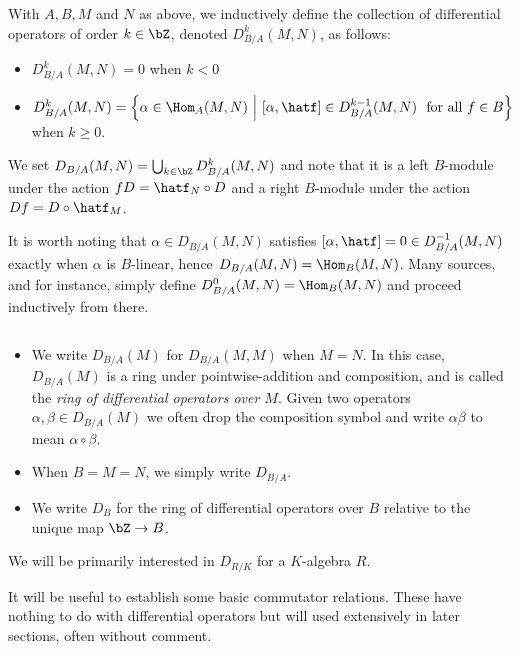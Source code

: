 \begin{defn}\label{defn:diff-ops}
	With $A,B,M$ and $N$ as above, we inductively define the collection of differential operators of order $k \in \bZ$, denoted $D^k_{B/A}(M,N)$, as follows:
	\begin{itemize}
		\item $D^k_{B/A}(M,N) = 0$ when $k < 0$
		\item $D^k_{B/A}(M,N) = \left\{\alpha \in \Hom_A(M,N) ~\middle|~ \left[\alpha,\hatf\right] \in D^{k-1}_{B/A}(M,N) ~ \text{ for all } f\in B\right\} $ when $k \geq 0$.
	\end{itemize}
	We set $D_{B/A}(M,N) = \bigcup_{k\in \bZ} D^k_{B/A}(M,N)$ and note that it is a left $B$-module under the action $fD = \hatf_N\circ D$ and a right $B$-module under the action $Df = D\circ \hatf_M$.
\end{defn}
\begin{rmk}\label{rmk:starting-index-of-diff-op-def}
	It is worth noting that $\alpha \in D_{B/A}(M,N)$ satisfies $[\alpha,\hatf] = 0 \in D^{-1}_{B/A}(M,N)$ exactly when $\alpha$ is $B$-linear, hence $D_{B/A}(M,N) = \Hom_B(M,N)$. Many sources, \cite{ginzburg_d-mod} and \cite{bernstein_d-mod} for instance, simply define $D^0_{B/A}(M,N) = \Hom_{B}(M,N)$ and proceed inductively from there.
\end{rmk}

\begin{notate}$ $
	\begin{itemize}
		\item We write $D_{B/A}(M)$ for $D_{B/A}(M,M)$ when $M = N$. In this case, $D_{B/A}(M)$ is a ring under pointwise-addition and composition, and is called the \emph{ring of differential operators over $M$}. Given two operators $\alpha,\beta \in D_{B/A}(M)$ we often drop the composition symbol and write $\alpha\beta$ to mean $\alpha\circ \beta$.
		\item When $B = M = N$, we simply write $D_{B/A}$.
		\item We write $D_B$ for the ring of differential operators over $B$ relative to the unique map $\bZ\to B$.
	\end{itemize}
\end{notate}
\noindent We will be primarily interested in $D_{R/K}$ for a $K$-algebra $R$.

It will be useful to establish some basic commutator relations. These have nothing to do with differential operators but will used extensively in later sections, often without comment.

